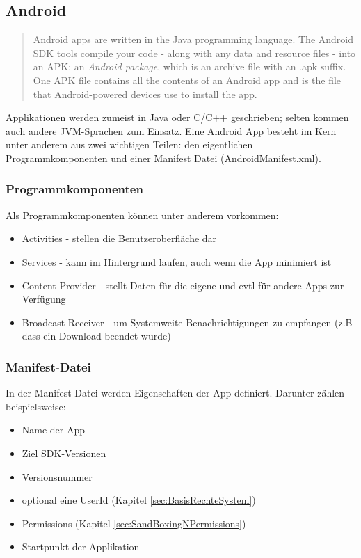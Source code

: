 \subsection{Android}\label{sec:app-android}
	\begin{quote}
	Android apps are written in the Java programming language. The Android SDK tools compile your code - along with any data and resource files - into an APK: an \textit{Android package}, which is an archive file with an .apk suffix. One APK file contains all the contents of an Android app and is the file that Android-powered devices use to install the app.\cite{AndroidApp}
	\end{quote}
	
\begin{flushleft}
	Applikationen werden zumeist in Java oder C/C++ geschrieben; selten kommen auch andere JVM-Sprachen zum Einsatz.
	Eine Android App besteht im Kern unter anderem aus zwei wichtigen Teilen: den eigentlichen Programmkomponenten und einer Manifest Datei (AndroidManifest.xml).\\
\end{flushleft}
	\subsubsection{Programmkomponenten}
	Als Programmkomponenten können unter anderem vorkommen:
	\begin{itemize}\itemsep0pt
		\item Activities - stellen die Benutzeroberfläche dar
		\item Services - kann im Hintergrund laufen, auch wenn die App minimiert ist
		\item Content Provider - stellt Daten für die eigene und evtl für andere Apps zur Verfügung
		\item Broadcast Receiver - um Systemweite Benachrichtigungen zu empfangen (z.B dass ein Download beendet wurde)
	\end{itemize}
	\subsubsection{Manifest-Datei}
	In der Manifest-Datei werden Eigenschaften der App definiert. Darunter zählen beispielsweise:
	\begin{itemize}\itemsep0pt
		\item Name der App
		\item Ziel SDK-Versionen
		\item Versionsnummer
		\item optional eine UserId (Kapitel \ref*{sec:BasisRechteSystem})
		\item Permissions (Kapitel \ref*{sec:SandBoxingNPermissions})
		\item Startpunkt der Applikation
	\end{itemize}
